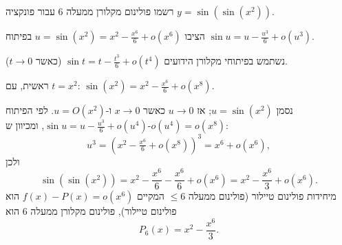
\begin{question}
רשמו פולינום מקלורן ממעלה 6 עבור פונקציה $y=\sin\left(\sin(x^2)\right)$.
\end{question}

\begin{hint}
הציבו $u=\sin(x^2)=x^2-\frac{x^6}{6}+o(x^6)$ בפיתוח $\sin u = u-\frac{u^3}{6}+o(u^3)$.
\end{hint}

\begin{solution}
נשתמש בפיתוחי מקלורן הידועים $\sin t = t - \frac{t^3}{6} + o(t^4)$ (כאשר $t\to0$).

ראשית, עם $t=x^2$: $\sin(x^2) = x^2 - \frac{x^6}{6} + o(x^8)$.

נסמן $u=\sin(x^2)$; אז $u\to 0$ כאשר $x\to0$ ו-$u = O(x^2)$. לפי הפיתוח $\sin u = u - \frac{u^3}{6} + o(u^4)$, ומכיוון ש-$o(u^4)=o(x^8)$:
\[ u^3 = \left(x^2-\tfrac{x^6}{6}+o(x^8)\right)^3 = x^6 + o(x^6), \]
ולכן
\[ \sin(\sin(x^2)) = x^2 - \frac{x^6}{6} - \frac{x^6}{6} + o(x^6) = x^2 - \frac{x^6}{3} + o(x^6). \]
מיחידות פולינום טיילור (פולינום ממעלה $\le 6$ המקיים $f(x)-P(x)=o(x^6)$ הוא פולינום טיילור), פולינום מקלורן ממעלה 6 הוא
\[ P_6(x) = x^2 - \frac{x^6}{3}. \]
\end{solution}
